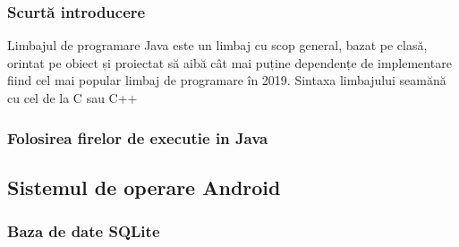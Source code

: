 \documentclass[../IoMusT.tex]{subfiles}
\begin{document}
\subsubsection{Scurtă introducere}
Limbajul de programare Java este un limbaj cu scop general, bazat pe clasă, orintat pe obiect și proiectat să aibă	cât mai puține dependențe de implementare fiind cel mai popular limbaj de programare în 2019. Sintaxa limbajului seamănă cu cel de la C sau C++
\subsubsection{Folosirea firelor de executie in Java}

\subsection{Sistemul de operare Android}
\subsubsection{Baza de date SQLite}
\end{document}
